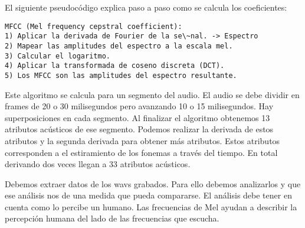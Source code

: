 El siguiente pseudocódigo explica paso a paso como se calcula los coeficientes:
\begin{lstlisting}
MFCC (Mel frequency cepstral coefficient):
1) Aplicar la derivada de Fourier de la se\~nal. -> Espectro
2) Mapear las amplitudes del espectro a la escala mel.
3) Calcular el logaritmo.
4) Aplicar la transformada de coseno discreta (DCT).
5) Los MFCC son las amplitudes del espectro resultante.
\end{lstlisting}

Este algoritmo se calcula para un segmento del audio. El audio se debe dividir en frames de 20 o 30 milisegundos pero avanzando 10 o 15 milisegundos. Hay superposiciones en cada segmento. Al finalizar el algoritmo obtenemos 13 atributos acústicos de ese segmento. Podemos realizar la derivada de estos atributos y la segunda derivada para obtener más atributos. Estos atributos corresponden a el estiramiento de los fonemas a través del tiempo. En total derivando dos veces llegan a 33 atributos acústicos.

Debemos extraer datos de los wavs grabados. Para ello debemos analizarlos y que ese análisis nos de una medida que pueda compararse. El análisis debe tener en cuenta como lo percibe un humano. Las frecuencias de Mel ayudan a describir la percepción humana del lado de las frecuencias que escucha. 

